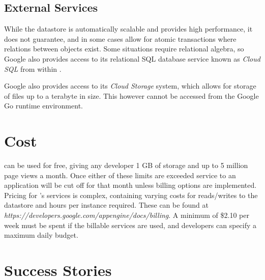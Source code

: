 \subsection{External Services}
While the datastore is automatically scalable and provides high performance, it does not guarantee, and in some cases allow for atomic transactions where relations between objects exist. Some situations require relational algebra, so Google also provides access to its relational SQL database service known as \emph{Cloud SQL} from within \gae{}. 

Google also provides access to its \emph{Cloud Storage} system, which allows for storage of files up to a terabyte in size. This however cannot be accessed from the Google Go runtime environment.

\section{Cost}
\gae{} can be used for free, giving any developer 1 GB of storage and up to 5 million page views a month. Once either of these limits are exceeded service to an application will be cut off for that month unless billing options are implemented. Pricing for \gae{}'s services is complex, containing varying costs for reads/writes to the datastore and hours per instance required. These can be found at \emph{https://developers.google.com/appengine/docs/billing}. A minimum of \$2.10 per week must be spent if the billable services are used, and developers can specify a maximum daily budget.

\section{Success Stories}

